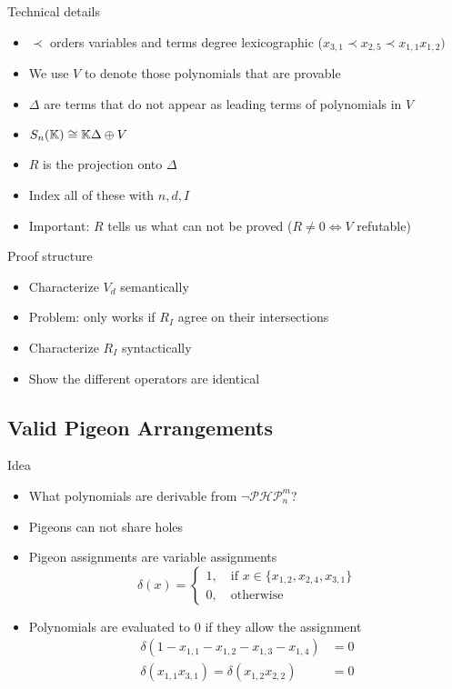 \documentclass[xcolor={dvipsnames}, aspectratio=169, handout]{beamer}
\newcommand{\Sn}{S_n(\KK)}
\newcommand{\PHP}{\ensuremath{\neg \mathcal{PHP}^m_n}\xspace}
\begin{document}
\begin{frame}{Technical details}
    \begin{itemize}[<+->]
        \item $\prec$ orders variables and terms degree lexicographic ($ x_{3, 1} \prec x_{2, 5} \prec x_{1, 1} x_{1, 2} )$
        \item We use $V$ to denote those polynomials that are provable
        \item $\Delta$ are terms that do not appear as leading terms of polynomials in $V$
        \item $\Sn \cong \KK \Delta \oplus V$
        \item $R$ is the projection onto $\Delta$
        \item Index all of these with $n, d, I$
        \item Important: $R$ tells us what can not be proved ($R \neq 0 \Leftrightarrow V$ refutable)
    \end{itemize}
\end{frame}

\begin{frame}{Proof structure}
    \begin{itemize}[<+->]
        \item Characterize $V_d$ semantically
        \item Problem: only works if $R_I$ agree on their intersections
        \item Characterize $R_I$ syntactically
        \item Show the different operators are identical
    \end{itemize}
\end{frame}

\subsection{Valid Pigeon Arrangements}
\begin{frame}{Idea}
    \begin{itemize}[<+->]
        \item What polynomials are derivable from \PHP?
        \item Pigeons can not share holes
        \item Pigeon assignments are variable assignments
            $$\delta(x) = \begin{cases}
                1, \quad \text{if } x \in \{x_{1, 2}, x_{2, 4}, x_{3, 1}\}\\
                0, \quad \text{otherwise}
            \end{cases}$$
        \item Polynomials are evaluated to $0$ if they allow the assignment
            \begin{align*}
                \delta(1 - x_{1, 1} - x_{1, 2} - x_{1, 3} - x_{1, 4}) &= 0\\
                \delta(x_{1, 1} x_{3, 1}) = \delta(x_{1, 2} x_{2, 2}) &= 0
            \end{align*}
    \end{itemize}
\end{frame}
\end{document}
